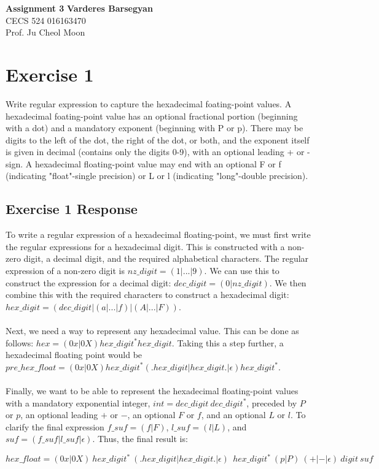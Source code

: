 \documentclass[a4paper, 11pt]{article}
\DeclareRobustCommand{\answer}[2][gray!15]{%
\begin{tcolorbox}[   %
        breakable,
        left=0pt,
        right=0pt,
        top=0pt,
        bottom=0pt,
        colback=#1,
        colframe=#1,
        width=\dimexpr\textwidth\relax, 
        enlarge left by=0mm,
        boxsep=5pt,
        arc=0pt,outer arc=0pt,
        ]
        #2
\end{tcolorbox}
}
\begin{document}
\noindent
\large\textbf{Assignment 3} \hfill \textbf{Varderes Barsegyan} \\
\normalsize CECS 524 \hfill 016163470 \\
Prof. Ju Cheol Moon

\section*{\LARGE\textbf{Exercise 1}}
Write regular expression to capture the hexadecimal foating-point values. A hexadecimal foating-point value has an optional fractional portion (beginning with a dot) and a mandatory exponent (beginning with P or p). There may be digits to the left of the dot, the right of the dot, or both, and the exponent itself is given in decimal
(contains only the digits 0-9), with an optional leading + or - sign. A hexadecimal floating-point value may end with an optional F or f (indicating "float"-single precision) or L or l (indicating "long"-double precision).

\subsection*{\Large{Exercise 1 Response}}
\answer{
To write a regular expression of a hexadecimal floating-point, we must first write the regular expressions for a hexadecimal digit. This is constructed with a non-zero digit, a decimal digit, and the required alphabetical characters. The regular expression of a non-zero digit is $nz\_digit=(1|...|9)$. We can use this to construct the expression for a decimal digit: $dec\_digit=(0|nz\_digit)$. We then combine this with the required characters to construct a hexadecimal digit: $hex\_digit=(dec\_digit|(a|...|f)|(A|...|F))$. \\\\
Next, we need a way to represent any hexadecimal value. This can be done as follows: $hex=(0x|0X)hex\_digit^*hex\_digit$. Taking this a step further, a hexadecimal floating point would be $pre\_hex\_float=(0x|0X)hex\_digit^*(.hex\_digit|hex\_digit.|\epsilon)hex\_digit^*$. \\\\
Finally, we want to be able to represent the hexadecimal floating-point values with a mandatory exponential integer, $int=dec\_digit\:dec\_digit^*$, preceded by $P$ or $p$, an optional leading $+$ or $-$, an optional $F$ or $f$, and an optional $L$ or $l$. To clarify the final expression $f\_suf=(f|F)$, $l\_suf=(l|L)$, and $suf=(f\_suf|l\_suf|\epsilon)$. Thus, the final result is: \\
\begin{center}
\textbf{$hex\_float=(0x|0X)\:hex\_digit^*\:(.hex\_digit|hex\_digit.|\epsilon)\:\:hex\_digit^*\:(p|P)\:(+|-|\epsilon)\:digit\:suf$}
\end{center}
}
\end{document}
